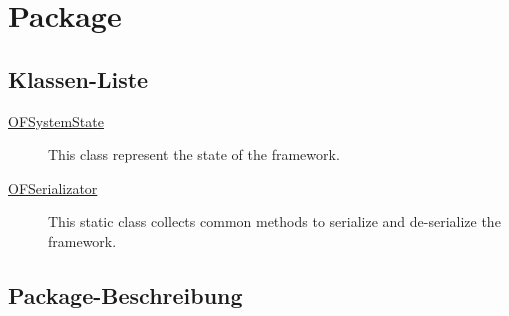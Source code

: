 
\chapter[Package ontologyFramework.OFRunning]{Package }\label{ontologyFramework.OFRunning-package}



\section{Klassen-Liste}
\begin{description}
\item[{\hyperlink{ontologyFramework.OFRunning.OFSystemState-class}{OFSystemState}}]
This class represent the state of the framework.
\hfill\pageref{ontologyFramework.OFRunning.OFSystemState-class}

\item[{\hyperlink{ontologyFramework.OFRunning.OFSerializator-class}{OFSerializator}}]
This static class collects common methods to serialize and de-serialize the framework.
\hfill\pageref{ontologyFramework.OFRunning.OFSerializator-class}

\end{description}
\section{Package-Beschreibung}



